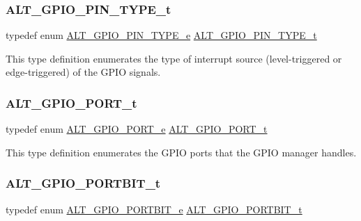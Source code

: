 \subsubsection{\texorpdfstring{ALT\_GPIO\_PIN\_TYPE\_t}{ALT\_GPIO\_PIN\_TYPE\_t}}
{\footnotesize\ttfamily typedef enum \mbox{\hyperlink{group__ALT__GPIO__API__CONFIG_gae750a74a5eafd2f86cf1c11749471465}{A\+L\+T\+\_\+\+G\+P\+I\+O\+\_\+\+P\+I\+N\+\_\+\+T\+Y\+P\+E\+\_\+e}}  \mbox{\hyperlink{group__ALT__GPIO__API__CONFIG_gafa3659cf3d59e915a16c591a73258eef}{A\+L\+T\+\_\+\+G\+P\+I\+O\+\_\+\+P\+I\+N\+\_\+\+T\+Y\+P\+E\+\_\+t}}}

This type definition enumerates the type of interrupt source (level-\/triggered or edge-\/triggered) of the G\+P\+IO signals. \mbox{\label{group__ALT__GPIO__API__CONFIG_gaaf1cf0e2a720d20cd883810f2b59097e}} 
\subsubsection{\texorpdfstring{ALT\_GPIO\_PORT\_t}{ALT\_GPIO\_PORT\_t}}
{\footnotesize\ttfamily typedef enum \mbox{\hyperlink{group__ALT__GPIO__API__CONFIG_ga15f94aa64366eb5fc5ed705322542d70}{A\+L\+T\+\_\+\+G\+P\+I\+O\+\_\+\+P\+O\+R\+T\+\_\+e}}  \mbox{\hyperlink{group__ALT__GPIO__API__CONFIG_gaaf1cf0e2a720d20cd883810f2b59097e}{A\+L\+T\+\_\+\+G\+P\+I\+O\+\_\+\+P\+O\+R\+T\+\_\+t}}}

This type definition enumerates the G\+P\+IO ports that the G\+P\+IO manager handles. \mbox{\label{group__ALT__GPIO__API__CONFIG_gae4215fdba724cf1aa2ddefdcadabe622}} 
\subsubsection{\texorpdfstring{ALT\_GPIO\_PORTBIT\_t}{ALT\_GPIO\_PORTBIT\_t}}
{\footnotesize\ttfamily typedef enum \mbox{\hyperlink{group__ALT__GPIO__API__CONFIG_ga655ce0b7b808aa71b821439fd82b9796}{A\+L\+T\+\_\+\+G\+P\+I\+O\+\_\+\+P\+O\+R\+T\+B\+I\+T\+\_\+e}}  \mbox{\hyperlink{group__ALT__GPIO__API__CONFIG_gae4215fdba724cf1aa2ddefdcadabe622}{A\+L\+T\+\_\+\+G\+P\+I\+O\+\_\+\+P\+O\+R\+T\+B\+I\+T\+\_\+t}}}


